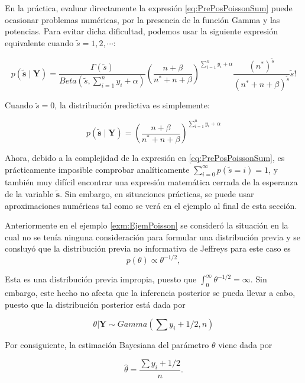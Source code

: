 \documentclass[
  10pt,
  spanish,
]{book}
\theoremstyle{definition}
\theoremstyle{definition}
\theoremstyle{definition}
\theoremstyle{definition}
\theoremstyle{remark}
\begin{document}
En la práctica, evaluar directamente la expresión \eqref{eq:PrePosPoissonSum} puede ocasionar problemas numéricas, por la presencia de la función Gamma y las potencias. Para evitar dicha dificultad, podemos usar la siguiente expresión equivalente cuando \(\tilde{s}=1,2,\cdots\):

\begin{equation*}
p(\tilde{\mathbf{s}} \mid \mathbf{Y})=\frac{\Gamma(\tilde{s})}{Beta(\tilde{s},\sum_{i=1}^ny_i+\alpha)}
\left(\frac{n+\beta}{n^*+n+\beta}\right)^{\sum_{i=1}^ny_i+\alpha}\frac{(n^*)^{\tilde{s}}}{(n^*+n+\beta)^{\tilde{s}}}\tilde{s}!
\end{equation*}

Cuando \(\tilde{s}=0\), la distribución predictiva es simplemente:

\begin{equation*}
p(\tilde{\mathbf{s}} \mid \mathbf{Y})=
\left(\frac{n+\beta}{n^*+n+\beta}\right)^{\sum_{i=1}^ny_i+\alpha}
\end{equation*}

Ahora, debido a la complejidad de la expresión en \eqref{eq:PrePosPoissonSum}, es prácticamente imposible comprobar analíticamente \(\sum_{i=0}^\infty p(\tilde{s}=i)=1\), y también muy difícil encontrar una expresión matemática cerrada de la esperanza de la variable \(\mathbf{\tilde{s}}\). Sin embargo, en situaciones prácticas, se puede usar aproximaciones numéricas tal como se verá en el ejemplo al final de esta sección.

Anteriormente en el ejemplo \ref{exm:EjemPoisson} se consideró la situación en la cual no se tenía ninguna consideración para formular una distribución previa y se consluyó que la distribución previa no informativa de Jeffreys para este caso es
\begin{equation*}
p(\theta)\propto\theta^{-1/2},
\end{equation*}

Esta es una distribución previa impropia, puesto que \(\int_{0}^\infty \theta^{-1/2}=\infty\). Sin embargo, este hecho no afecta que la inferencia posterior se pueda llevar a cabo, puesto que la distribución posterior está dada por

\begin{equation*}
\theta|\mathbf{Y}\sim Gamma(\sum y_i+1/2,n)
\end{equation*}

Por consiguiente, la estimación Bayesiana del parámetro \(\theta\) viene dada por

\begin{equation*}
\hat{\theta}=\frac{\sum y_i+1/2}{n}.
\end{equation*}
\end{document}
